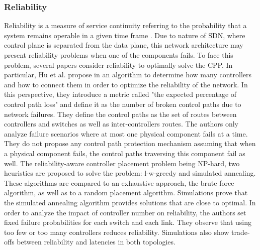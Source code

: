 \documentclass{IEEEtran}
\begin{document}
\subsubsection{Reliability} 
Reliability is a measure of service continuity referring to the probability that a system remains operable in a given time frame \cite{Rak15}. Due to nature of SDN, where control plane is separated from the data plane, this network architecture may present reliability problems when one of the components fails. To face this problem, several papers consider reliability to optimally solve the CPP. In particular, Hu et al. propose in \cite{HuWa12,HuWe13} an algorithm to determine how many controllers and how to connect them in order to optimize the reliability of the network. In this perspective, they introduce a metric called "the expected percentage of control path loss" and define it  as the number of broken control paths due to network failures. They define the control paths as the set of routes between controllers and switches as well as inter-controllers routes. The authors only analyze failure scenarios where at most one physical component fails at a time. They do not propose any control path protection mechanism assuming that when a physical component fails, the control paths traversing this component fail as well. The reliability-aware controller placement problem being NP-hard, two heuristics are proposed to solve the problem: l-w-greedy and simulated annealing. These algorithms are compared to an exhaustive approach, the brute force algorithm, as well as to a random placement algorithm. Simulations prove that the simulated annealing algorithm provides solutions that are close to optimal. In order to analyze the impact of controller number on reliability, the authors set fixed failure probabilities for each switch and each link. They observe that using too few or too many controllers reduces reliability. Simulations also show trade-offs between reliability and latencies in both topologies.

\end{document}

